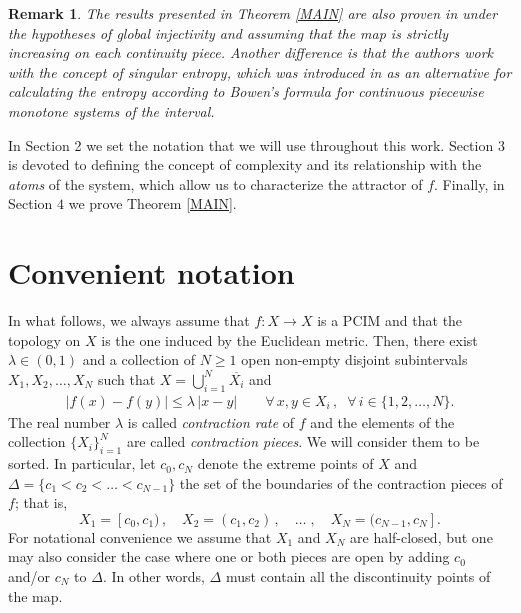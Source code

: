 \documentclass[a4paper]{article}
\newtheorem{remark}[theorem]{Remark}
\begin{document}
{\begin{remark}
    The results presented in Theorem \ref{MAIN} are also proven in \cite{GN22} under the hypotheses of global injectivity and assuming that the map is strictly increasing on each continuity piece. Another difference is that the authors work with the concept of {\it singular entropy}, which was introduced in \cite{MZ92} as an alternative for calculating the entropy according to Bowen's formula for continuous piecewise monotone systems of the interval.
\end{remark}
}

 In Section 2 we set the notation that we will use throughout this work. Section 3 is devoted to defining the concept of complexity and its relationship with the {\em atoms} of the system, which allow us to characterize the attractor of $f$. Finally, in Section $4$ we prove Theorem \ref{MAIN}.

\section{Convenient notation}

In what follows, we always assume that $f:X\to X$ is a PCIM and that the topology on $X$ is the one induced by the Euclidean metric. Then, there exist $\lambda\in(0,1)$ and a collection of $N\geq 1$ open non-empty disjoint subintervals $X_1,X_2,\ldots,X_N$ such that $X=\bigcup_{i=1}^N\overline{X_i}$ and
\begin{eqnarray}\label{eq1}
    |f(x)-f(y)|\leq\lambda\,|x-y|\qquad\forall\,x,y\in X_i\,,\;\;\forall\,i\in\{1,2,\ldots,N\}.
\end{eqnarray}
The real number $\lambda$ is called {\em contraction rate} of $f$ and the elements of the collection $\{X_i\}_{i=1}^N$ are called {\em contraction pieces}. We will consider them to be sorted. In particular, let $c_0,c_N$ denote the extreme points of $X$ and $\Delta=\{c_1<c_2<\dots<c_{N-1}\}$ the set of the boundaries of the contraction pieces of $f$; that is,
\[
    X_1=[c_0,c_1)\,,\quad X_2=(c_1,c_2)\,,\quad \dots\;,\quad X_N=(c_{N-1},c_N].
\]
For notational convenience we assume that $X_1$ and $X_N$ are half-closed, but one may also consider the case where one or both pieces are open by adding $c_0$ and/or $c_N$ to $\Delta$. In other words, $\Delta$ must contain all the discontinuity points of the map.
\end{document}
